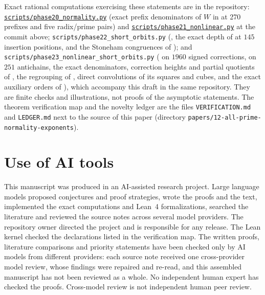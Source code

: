 \documentclass[11pt]{article}
\newcommand{\ttt}[1]{\texttt{#1}}
\newcommand{\phaseXXIcommit}{347ec3fe631a3e7ab2ae25d53508a3a4c9ea9fa8}
\begin{document}
Exact rational computations exercising these statements are in the repository:
\href{https://github.com/eldernos/MathematicsResearch/tree/\phaseXXIcommit/scripts/phase20_normality.py}{\ttt{scripts/phase20\_normality.py}}
(exact prefix denominators of $W$ in  at 270 prefixes and five radix/prime pairs) and
\href{https://github.com/eldernos/MathematicsResearch/tree/\phaseXXIcommit/scripts/phase21_nonlinear.py}{\ttt{scripts/phase21\_nonlinear.py}}
at the commit above; \ttt{scripts/phase22\_short\_orbits.py} (, the exact depth of
 at $145$ insertion positions, and the Stoneham congruences of ); and
\ttt{scripts/phase23\_nonlinear\_short\_orbits.py} ( on $1960$ signed corrections,  on $251$
antichains, the exact denominators, correction heights and partial quotients of , the regrouping of
, direct convolutions of its squares and cubes, and the exact auxiliary orders of ), which
accompany this draft in the same repository. They are finite checks and illustrations, not proofs of the asymptotic statements. The
theorem verification map and the novelty ledger are the files \ttt{VERIFICATION.md} and \ttt{LEDGER.md} next to the source of this
paper (directory \ttt{papers/12-all-prime-normality-exponents}).

\section{Use of AI tools}

This manuscript was produced in an AI-assisted research project. Large language models proposed conjectures and proof
strategies, wrote the proofs and the text, implemented the exact computations and Lean~4 formalizations, searched the
literature and reviewed the source notes across several model providers. The repository owner directed the project and is
responsible for any release. The Lean kernel checked the declarations listed in the verification map. The written proofs,
literature comparisons and priority statements have been checked only by AI models from different providers: each source note
received one cross-provider model review, whose findings were repaired and re-read, and this assembled manuscript has not been
reviewed as a whole. No independent human expert has checked the proofs. Cross-model review is not independent human peer review.



\end{document}
